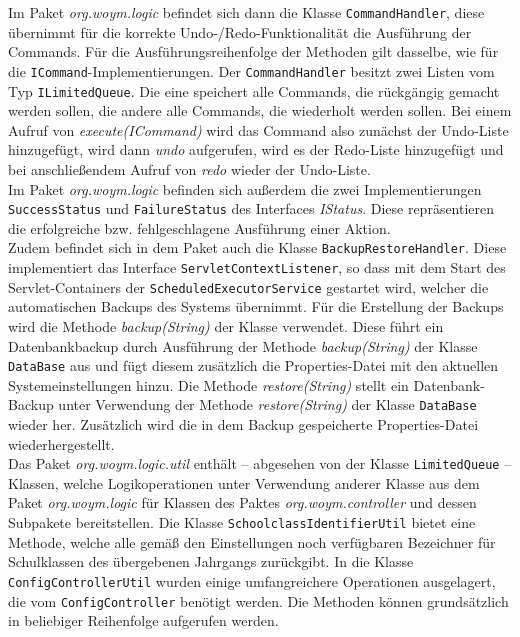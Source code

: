 \documentclass[fontsize=12pt,paper=a4,twoside]{scrartcl}
\begin{document}
Im Paket \textit{org.woym.logic} befindet sich dann die Klasse \texttt{CommandHandler}, diese übernimmt für die korrekte Undo-/Redo-Funktionalität die Ausführung der Commands. Für die Ausführungsreihenfolge der Methoden gilt dasselbe, wie für die \texttt{ICommand}-Implementierungen. Der \texttt{CommandHandler} besitzt zwei Listen vom Typ \texttt{ILimitedQueue}. Die eine speichert alle Commands, die rückgängig gemacht werden sollen, die andere alle Commands, die wiederholt werden sollen. Bei einem Aufruf von \textit{execute(ICommand)} wird das Command also zunächst der Undo-Liste hinzugefügt, wird dann \textit{undo} aufgerufen, wird es der Redo-Liste hinzugefügt und bei anschließendem Aufruf von \textit{redo} wieder der Undo-Liste.\\
Im Paket \textit{org.woym.logic} befinden sich außerdem die zwei Implementierungen \texttt{SuccessStatus} und \texttt{FailureStatus} des Interfaces \textit{IStatus}. Diese repräsentieren die erfolgreiche bzw. fehlgeschlagene Ausführung einer Aktion.\\
Zudem befindet sich in dem Paket auch die Klasse \texttt{BackupRestoreHandler}. Diese implementiert das Interface \texttt{ServletContextListener}, so dass mit dem Start des Servlet-Containers der \texttt{ScheduledExecutorService} gestartet wird, welcher die automatischen Backups des Systems übernimmt. Für die Erstellung der Backups wird die Methode \textit{backup(String)} der Klasse verwendet. Diese führt ein Datenbankbackup durch Ausführung der Methode \textit{backup(String)} der Klasse \texttt{DataBase} aus und fügt diesem zusätzlich die Properties-Datei mit den aktuellen Systemeinstellungen hinzu. Die Methode \textit{restore(String)} stellt ein Datenbank-Backup unter Verwendung der Methode \textit{restore(String)} der Klasse \texttt{DataBase} wieder her. Zusätzlich wird die in dem Backup gespeicherte Properties-Datei wiederhergestellt. \\
Das Paket \textit{org.woym.logic.util} enthält -- abgesehen von der Klasse \texttt{LimitedQueue} -- Klassen, welche Logikoperationen unter Verwendung anderer Klasse aus dem Paket \textit{org.woym.logic} für Klassen des Paktes \textit{org.woym.controller} und dessen Subpakete bereitstellen. Die Klasse \texttt{SchoolclassIdentifierUtil} bietet eine Methode, welche alle gemäß den Einstellungen noch verfügbaren Bezeichner für Schulklassen des übergebenen Jahrgangs zurückgibt. In die Klasse \texttt{ConfigControllerUtil} wurden einige umfangreichere Operationen ausgelagert, die vom \texttt{ConfigController} benötigt werden. Die Methoden können grundsätzlich in beliebiger Reihenfolge aufgerufen werden.\\
\end{document}
